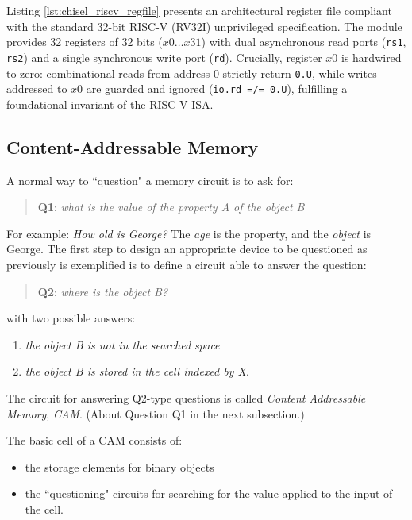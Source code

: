 {Listing \ref{lst:chisel_riscv_regfile} presents an architectural register file compliant with the standard 32-bit RISC-V (RV32I) unprivileged specification. The module provides 32 registers of 32 bits ($x0 \dots x31$) with dual asynchronous read ports (\texttt{rs1}, \texttt{rs2}) and a single synchronous write port (\texttt{rd}). Crucially, register $x0$ is hardwired to zero: combinational reads from address $0$ strictly return \texttt{0.U}, while writes addressed to $x0$ are guarded and ignored (\texttt{io.rd =/= 0.U}), fulfilling a foundational invariant of the RISC-V ISA.
}%




\subsection{Content-Addressable Memory}\label{lb:cam}
A normal way to ``question" a memory circuit is to ask for:
\begin{quote}
{\bf Q1}: {\em what is the value of the property A of the object B}
\end{quote}
For example: {\em How old is George?} The {\em age} is the
property, and the {\em object} is George. The first step to design
an appropriate device to be questioned as previously is
exemplified is to define a circuit able to answer the question:
\begin{quote}
{\bf Q2}: {\em where is the object B?}
\end{quote}
with two possible answers:
\begin{enumerate}
    \item {\em the object B is not in the searched space}
    \item {\em the object B is stored in the cell indexed by X}.
\end{enumerate}
The circuit for answering Q2-type questions is called {\em Content
Addressable Memory}, {\em CAM}. (About Question Q1 in
the next subsection.)

The basic cell of a CAM consists of:
\begin{itemize}
    \item the storage elements for binary objects
    \item the ``questioning" circuits for searching for the value
    applied to the input of the cell.
\end{itemize}

